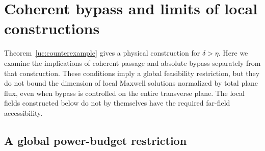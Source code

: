 \section{Coherent bypass and limits of local constructions}
\label{ca:section}

Theorem~\ref{uc:counterexample} gives a physical construction for
$\delta>\eta$. Here we examine the implications of coherent passage and
absolute bypass separately from that construction. These conditions imply
a global feasibility restriction, but they do not bound the dimension of
local Maxwell solutions normalized by total plane flux, even when bypass is
controlled on the entire transverse plane. The local fields constructed
below do not by themselves have the required far-field accessibility.

\subsection{A global power-budget restriction}

